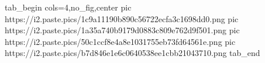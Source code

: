  
 
 
 
 
\zzSecCmtScr

\ifcmt
  tab_begin cols=4,no_fig,center
     pic https://i2.paste.pics/1c9a11190b890c56722ecfa3c1698dd0.png
     pic https://i2.paste.pics/1a35a740b9179d0883c809e762d9f501.png
     pic https://i2.paste.pics/50c1ccf8e4a8e1031755eb73fd64561e.png
     pic https://i2.paste.pics/b7d846e1e6c0640538ee1cbb21043710.png
  tab_end
\fi
